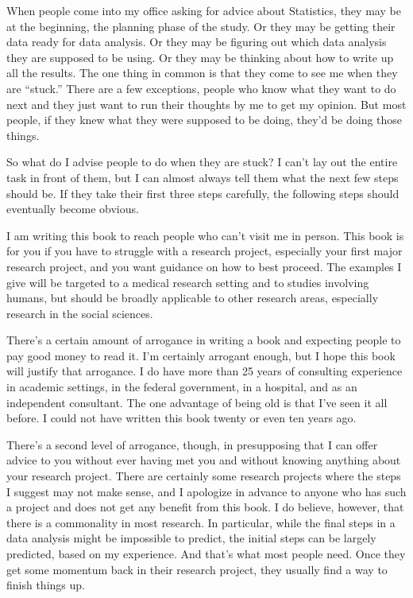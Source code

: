 \documentclass[
  letterpaper,
  DIV=11,
  numbers=noendperiod]{scrreprt}
\begin{document}
When people come into my office asking for advice about Statistics, they
may be at the beginning, the planning phase of the study. Or they may be
getting their data ready for data analysis. Or they may be figuring out
which data analysis they are supposed to be using. Or they may be
thinking about how to write up all the results. The one thing in common
is that they come to see me when they are ``stuck.'' There are a few
exceptions, people who know what they want to do next and they just want
to run their thoughts by me to get my opinion. But most people, if they
knew what they were supposed to be doing, they'd be doing those things.

So what do I advise people to do when they are stuck? I can't lay out
the entire task in front of them, but I can almost always tell them what
the next few steps should be. If they take their first three steps
carefully, the following steps should eventually become obvious.

I am writing this book to reach people who can't visit me in person.
This book is for you if you have to struggle with a research project,
especially your first major research project, and you want guidance on
how to best proceed. The examples I give will be targeted to a medical
research setting and to studies involving humans, but should be broadly
applicable to other research areas, especially research in the social
sciences.

There's a certain amount of arrogance in writing a book and expecting
people to pay good money to read it. I'm certainly arrogant enough, but
I hope this book will justify that arrogance. I do have more than 25
years of consulting experience in academic settings, in the federal
government, in a hospital, and as an independent consultant. The one
advantage of being old is that I've seen it all before. I could not have
written this book twenty or even ten years ago.

There's a second level of arrogance, though, in presupposing that I can
offer advice to you without ever having met you and without knowing
anything about your research project. There are certainly some research
projects where the steps I suggest may not make sense, and I apologize
in advance to anyone who has such a project and does not get any benefit
from this book. I do believe, however, that there is a commonality in
most research. In particular, while the final steps in a data analysis
might be impossible to predict, the initial steps can be largely
predicted, based on my experience. And that's what most people need.
Once they get some momentum back in their research project, they usually
find a way to finish things up.
\end{document}
